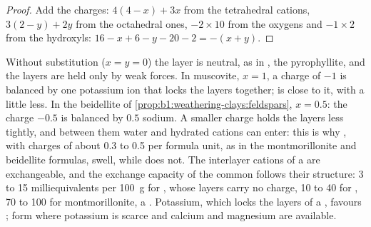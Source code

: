 \begin{proof}
Add the charges: $4(4 - x) + 3x$ from the tetrahedral cations, $3(2 - y) + 2y$
from the octahedral ones, $-2\times10$ from the oxygens and $-1\times2$ from the
hydroxyls: $16 - x + 6 - y - 20 - 2 = -(x + y)$.
\end{proof}

Without substitution ($x = y = 0$) the layer is neutral, as in
, the  pyrophyllite, and the layers are held only by
weak forces.
In muscovite, $x = 1$, a charge of $-1$ is balanced by one potassium ion that
locks the layers together;  is close to it, with a little less. In the
beidellite of \cref{prop:b1:weathering-clays:feldspars}, $x = 0.5$: the charge
$-0.5$ is balanced by $0.5$ sodium. A smaller charge holds the layers less
tightly, and between them water and hydrated cations can enter: this is why
, with charges of about 0.3 to 0.5 per formula unit, as in the
montmorillonite and beidellite formulas, swell, while  does not. The
interlayer cations of a  are exchangeable, and the exchange capacity of
the common  follows their structure: 3 to 15 milliequivalents per
\qty{100}{g} for , whose layers carry no charge, 10 to 40 for ,
70 to 100 for montmorillonite, a . Potassium, which locks the layers
of a , favours ;  form where potassium is scarce and
calcium and magnesium are available.

